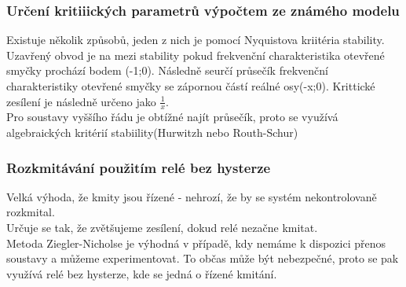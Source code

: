 \subsubsection*{Určení kritiiických parametrů výpočtem ze známého modelu}
Existuje několik způsobů, jeden z nich je pomocí Nyquistova kriitéria stability. Uzavřený obvod je na mezi stability pokud frekvenční charakteristika otevřené smyčky prochází bodem (-1;0). Následně seurčí průsečík frekvenční charakteristiky otevřené smyčky se zápornou částí reálné osy(-x;0). Krittické zesílení je následně určeno jako $\frac{1}{x}$.\\
Pro soustavy vyššího řádu je obtížné najít průsečík, proto se využívá algebraických kritérií stabiility(Hurwitzh nebo Routh-Schur)

\subsubsection*{Rozkmitávání použitím relé bez hysterze}
Velká výhoda, že kmity jsou řízené - nehrozí, že by se systém nekontrolovaně rozkmital.\\
Určuje se tak, že zvětšujeme zesílení, dokud relé  nezačne kmitat.\\

Metoda Ziegler-Nicholse je výhodná v případě, kdy nemáme k dispozici přenos soustavy a můžeme experimentovat. To občas může být nebezpečné, proto se pak využívá relé bez hysterze, kde se jedná o řízené kmitání.\\

